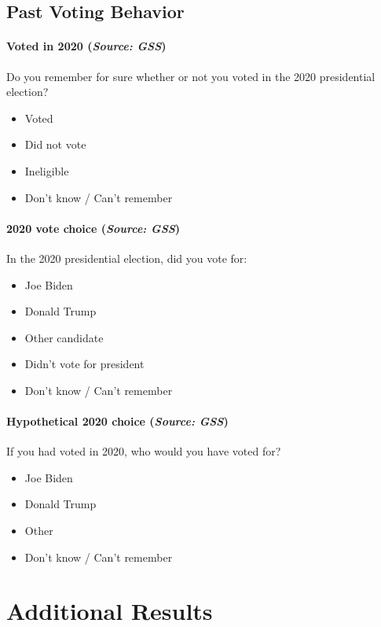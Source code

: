 \documentclass[letterpaper,12pt]{article}
\theoremstyle{proposition}
\begin{document}
\subsection*{Past Voting Behavior}

\paragraph{Voted in 2020 (\textit{Source: GSS})}
Do you remember for sure whether or not you voted in the 2020 presidential election?
\begin{itemize}[itemsep=-10pt,topsep=0pt]
\item Voted
\item Did not vote
\item Ineligible
\item Don’t know / Can’t remember
\end{itemize}

\paragraph{2020 vote choice (\textit{Source: GSS})}
In the 2020 presidential election, did you vote for:
\begin{itemize}[itemsep=-10pt,topsep=0pt]
\item Joe Biden
\item Donald Trump
\item Other candidate
\item Didn’t vote for president
\item Don’t know / Can’t remember
\end{itemize}

\paragraph{Hypothetical 2020 choice (\textit{Source: GSS})}
If you had voted in 2020, who would you have voted for?
\begin{itemize}[itemsep=-10pt,topsep=0pt]
\item Joe Biden
\item Donald Trump
\item Other
\item Don’t know / Can’t remember
\end{itemize}







\section*{Additional Results}
\end{document}
